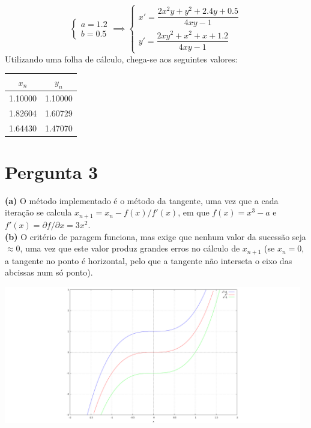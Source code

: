 \begin{equation*}
	\begin{cases}
		a=1.2\\
		b=0.5
	\end{cases}
	\implies
	\begin{cases}
		x'=\dfrac{2x^2y+y^2+2.4y+0.5}{4xy-1}\\[1em]
		y'=\dfrac{2xy^2+x^2+x+1.2}{4xy-1}
	\end{cases}
\end{equation*}
Utilizando uma folha de cálculo, chega-se aos seguintes valores:
\begin{center}
\begin{tabular}{c | c}
	$x_n$ & $y_n$ \\ \hline
	1.10000 & 1.10000\\
	1.82604 & 1.60729\\
	1.64430 & 1.47070
\end{tabular}
\end{center}
\section{Pergunta 3}
\textbf{(a)} O método implementado é o método da tangente, uma vez que a cada iteração se calcula $x_{n+1}=x_n-f(x)/f'(x)$, em que $f(x) = x^3-a$ e $f'(x)=\partial f/\partial x=3x^2$.\\
\textbf{(b)} O critério de paragem funciona, mas exige que nenhum valor da sucessão seja $\approx 0$, uma vez que este valor produz grandes erros no cálculo de $x_{n+1}$ (se $x_n=0$, a tangente no ponto é horizontal, pelo que a tangente não interseta o eixo das abcissas num só ponto).
\begin{center} \includegraphics[height=60mm,keepaspectratio]{DESC1T1-3-b} \end{center}
